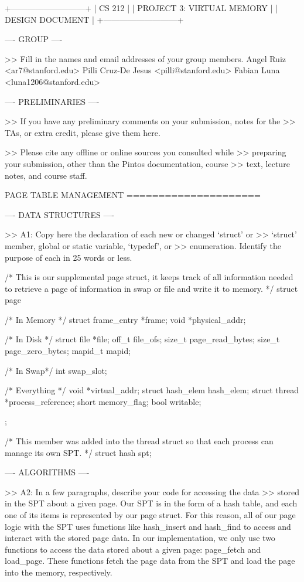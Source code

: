             +---------------------------+
            |          CS 212           |
            | PROJECT 3: VIRTUAL MEMORY |
            |      DESIGN DOCUMENT      |
            +---------------------------+

---- GROUP ----

>> Fill in the names and email addresses of your group members.
Angel Ruiz <ar7@stanford.edu>
Pilli Cruz-De Jesus <pilli@stanford.edu>
Fabian Luna <luna1206@stanford.edu>

---- PRELIMINARIES ----

>> If you have any preliminary comments on your submission, notes for the
>> TAs, or extra credit, please give them here.

>> Please cite any offline or online sources you consulted while
>> preparing your submission, other than the Pintos documentation, course
>> text, lecture notes, and course staff.

            PAGE TABLE MANAGEMENT
            =====================

---- DATA STRUCTURES ----

>> A1: Copy here the declaration of each new or changed `struct' or
>> `struct' member, global or static variable, `typedef', or
>> enumeration.  Identify the purpose of each in 25 words or less.

/* This is our supplemental page struct, it keeps
track of all information needed to retrieve a page
of information in swap or file and write it to memory. */
struct page {
    /* In Memory */
    struct frame_entry *frame;
    void *physical_addr;

    /* In Disk */
    struct file *file;
    off_t file_ofs;
    size_t page_read_bytes;
    size_t page_zero_bytes;
    mapid_t mapid;

    /* In Swap*/
    int swap_slot;

    /* Everything */
    void *virtual_addr;
    struct hash_elem hash_elem;
    struct thread *process_reference;
    short memory_flag;    
    bool writable;
};

/* This member was added into the thread struct so that each process can manage its own SPT. */
struct hash spt;

---- ALGORITHMS ----

>> A2: In a few paragraphs, describe your code for accessing the data
>> stored in the SPT about a given page.
Our SPT is in the form of a hash table, and each one of its items is represented by our 
page struct. For this reason, all of our page logic with the SPT uses functions like 
hash_insert and hash_find to access and interact with the stored page data. In our 
implementation, we only use two functions to access the data stored about a given page: 
page_fetch and load_page. These functions fetch the page data from the SPT and load the page
into the memory, respectively.

